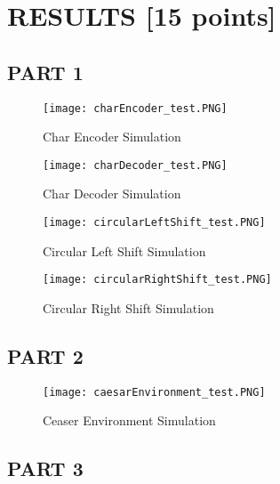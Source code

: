 \documentclass[pdftex,12pt,a4paper]{article}
\begin{document}
\clearpage


\section{RESULTS [15 points]}
\subsection{PART 1}

\begin{figure}[ht]
	\centering
	\texttt{[image: charEncoder\_test.PNG]}	
	\caption{Char Encoder Simulation}
	\label{}
\end{figure}

\begin{figure}[ht]
	\centering
	\texttt{[image: charDecoder\_test.PNG]}	
	\caption{Char Decoder Simulation}
	\label{}
\end{figure}

\begin{figure}[ht]
	\centering
	\texttt{[image: circularLeftShift\_test.PNG]}	
	\caption{Circular Left Shift Simulation}
	\label{}
\end{figure}

\begin{figure}[ht]
	\centering
	\texttt{[image: circularRightShift\_test.PNG]}	
	\caption{Circular Right Shift Simulation}
	\label{}
\end{figure}




\clearpage

\subsection{PART 2}

\begin{figure}[ht]
	\centering
	\texttt{[image: caesarEnvironment\_test.PNG]}	
	\caption{Ceaser Environment Simulation}
	\label{}
\end{figure}

\clearpage





\subsection{PART 3}

\clearpage
\end{document}
